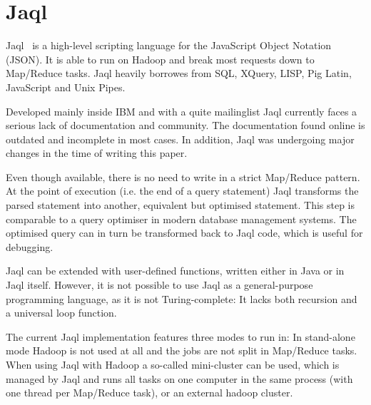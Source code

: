 \section{Jaql}

Jaql~\cite{jaqlWebsite} is a high-level scripting language for the JavaScript Object Notation (JSON).
It is able to run on Hadoop and break most requests down to Map/Reduce tasks.
Jaql heavily borrowes from SQL, XQuery, LISP, Pig Latin, JavaScript and Unix Pipes.~\cite{jaqlOverview}

Developed mainly inside IBM and with a quite mailinglist Jaql currently faces
a serious lack of documentation and community. The documentation found online
is outdated and incomplete in most cases. In addition, Jaql was undergoing
major changes in the time of writing this paper.

Even though available, there is no need to write in a strict Map/Reduce pattern. At the point of execution (i.e. the end of a query statement) Jaql transforms the
parsed statement into another, equivalent but optimised statement. This step is
comparable to a query optimiser in modern database management systems. The optimised
query can in turn be transformed back to Jaql code, which is useful for debugging.

Jaql can be extended with user-defined functions, written either in Java or
in Jaql itself. However, it is not possible to use Jaql as a general-purpose programming
language, as it is not Turing-complete: It lacks both recursion and a universal loop
function.

The current Jaql implementation features three modes to run in: In stand-alone mode Hadoop
is not used at all and the jobs are not split in Map/Reduce tasks. When using Jaql
with Hadoop a so-called mini-cluster can be used, which is managed by Jaql and runs all tasks
on one computer in the same process (with one thread per Map/Reduce task), or an external hadoop cluster.